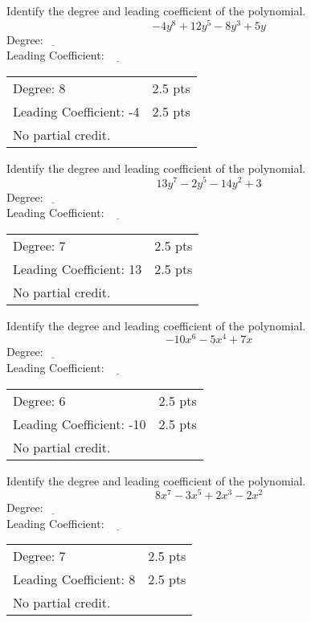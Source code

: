 {
	Identify the degree and leading coefficient of the polynomial. $$-4y^8+12y^5-8y^3+5y$$
	Degree:$\underline{~~~~~~~~}$ \\
	Leading Coefficient: $\underline{~~~~~~~~}$
}
{
	\begin{tabular}{l r}
	Degree: 8  & 2.5 pts\\
	Leading Coefficient: -4 & 2.5 pts \\ 
	No partial credit.
	\end{tabular}
}

{
	Identify the degree and leading coefficient of the polynomial. $$13y^7-2y^5-14y^2+3$$
	Degree:$\underline{~~~~~~~~}$ \\
	Leading Coefficient: $\underline{~~~~~~~~}$
}
{
	\begin{tabular}{l r}
	Degree: 7 & 2.5 pts\\
	Leading Coefficient: 13 & 2.5 pts \\
	No partial credit.
	\end{tabular}
}

{
	Identify the degree and leading coefficient of the polynomial. $$-10x^6-5x^4+7x$$
	Degree:$\underline{~~~~~~~~}$ \\
	Leading Coefficient: $\underline{~~~~~~~~}$
}
{
	\begin{tabular}{l r}
	Degree: 6 & 2.5 pts\\
	Leading Coefficient: -10 & 2.5 pts \\
	No partial credit.
	\end{tabular}
}

{
	Identify the degree and leading coefficient of the polynomial. $$8x^7-3x^5+2x^3-2x^2$$
	Degree:$\underline{~~~~~~~~}$ \\
	Leading Coefficient: $\underline{~~~~~~~~}$
}
{
	\begin{tabular}{l r}
	Degree: 7 & 2.5 pts\\
	Leading Coefficient: 8 & 2.5 pts \\
	No partial credit.
	\end{tabular}
}
